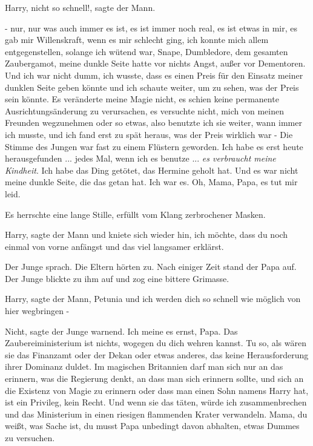 \glqq{}Harry, nicht so schnell!\grqq{}, sagte der Mann.

\glqq{}- nur, nur was auch immer es ist, es ist immer noch real, es ist etwas in
mir, es gab mir Willenskraft, wenn es mir schlecht ging, ich konnte mich allem
entgegenstellen, solange ich wütend war, Snape, Dumbledore, dem gesamten
Zaubergamot, meine dunkle Seite hatte vor nichts Angst, außer vor Dementoren.
Und ich war nicht dumm, ich wusste, dass es einen Preis für den Einsatz meiner
dunklen Seite geben könnte und ich schaute weiter, um zu sehen, was der Preis
sein könnte. Es veränderte meine Magie nicht, es schien keine permanente
Ausrichtungsänderung zu verursachen, es versuchte nicht, mich von meinen
Freunden wegzunehmen oder so etwas, also benutzte ich sie weiter, wann immer ich
musste, und ich fand erst zu spät heraus, was der Preis wirklich war -\grqq{}
Die Stimme des Jungen war fast zu einem Flüstern geworden. \glqq{}Ich habe es
erst heute herausgefunden ... jedes Mal, wenn ich es benutze ... \emph{es
verbraucht meine Kindheit}. Ich habe das Ding getötet, das Hermine geholt hat.
Und es war nicht meine dunkle Seite, die das getan hat. Ich war es. Oh, Mama,
Papa, es tut mir leid.\grqq{}

Es herrschte eine lange Stille, erfüllt vom Klang zerbrochener Masken.

\glqq{}Harry\grqq{}, sagte der Mann und kniete sich wieder hin, \glqq{}ich möchte,
dass du noch einmal von vorne anfängst und das viel langsamer erklärst.\grqq{}

Der Junge sprach. Die Eltern hörten zu. Nach einiger Zeit stand der Papa auf.
Der Junge blickte zu ihm auf und zog eine bittere Grimasse.

\glqq{}Harry\grqq{}, sagte der Mann, \glqq{}Petunia und ich werden dich so schnell
wie möglich von hier wegbringen -\grqq{}

\glqq{}Nicht\grqq{}, sagte der Junge warnend. \glqq{}Ich meine es ernst, Papa. Das
Zaubereiministerium ist nichts, wogegen du dich wehren kannst. Tu so, als wären
sie das Finanzamt oder der Dekan oder etwas anderes, das keine Herausforderung
ihrer Dominanz duldet. Im magischen Britannien darf man sich nur an das
erinnern, was die Regierung denkt, an dass man sich erinnern sollte, und sich an
die Existenz von Magie zu erinnern oder dass man einen Sohn namens Harry hat,
ist ein Privileg, kein Recht. Und wenn sie das täten, würde ich zusammenbrechen
und das Ministerium in einen riesigen flammenden Krater verwandeln. Mama, du
weißt, was Sache ist, du musst Papa unbedingt davon abhalten, etwas Dummes zu
versuchen.\grqq{}


